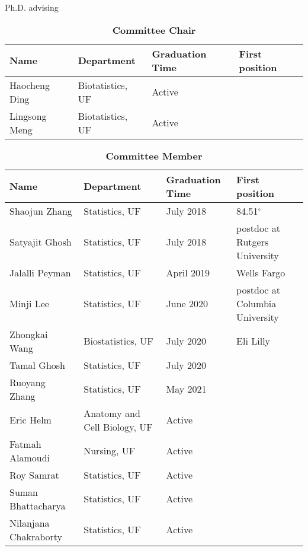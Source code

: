 \documentclass{resume} %
\begin{document}
\begin{rSection}{Ph.D. advising}

\begin{table}[htp]
\caption*{\textbf{Committee Chair}}
\begin{center}
\begin{tabular}{l l l l}
\hline
\hline
Name & Department & Graduation Time & First position \\
\hline
Haocheng Ding & Biotatistics, UF & Active &  \\
Lingsong Meng & Biotatistics, UF & Active &  \\
\hline
\hline
\end{tabular}
\end{center}
\label{default}
\end{table}%


\begin{table}[htp]
\caption*{\textbf{Committee Member}}
\begin{center}
\begin{tabular}{l l l l}
\hline
\hline
Name & Department & Graduation Time & First position \\
\hline
Shaojun Zhang & Statistics, UF & July 2018 & 84.51$^\circ$ \\
Satyajit Ghosh & Statistics, UF & July 2018 & postdoc at Rutgers University \\
Jalalli Peyman & Statistics, UF & April 2019 & Wells Fargo \\
Minji Lee & Statistics, UF & June 2020 &postdoc at Columbia University\\
Zhongkai Wang &  Biostatistics, UF & July 2020 & Eli Lilly \\
Tamal Ghosh & Statistics, UF & July 2020 & \\
Ruoyang Zhang & Statistics, UF & May 2021 & \\
Eric Helm &  Anatomy and Cell Biology, UF & Active & \\
Fatmah Alamoudi & Nursing, UF & Active & \\
Roy Samrat & Statistics, UF & Active & \\
Suman Bhattacharya & Statistics, UF & Active & \\
Nilanjana Chakraborty & Statistics, UF & Active & \\
\hline
\hline
\end{tabular}
\end{center}
\label{default}
\end{table}%

\end{rSection}
\end{document}

